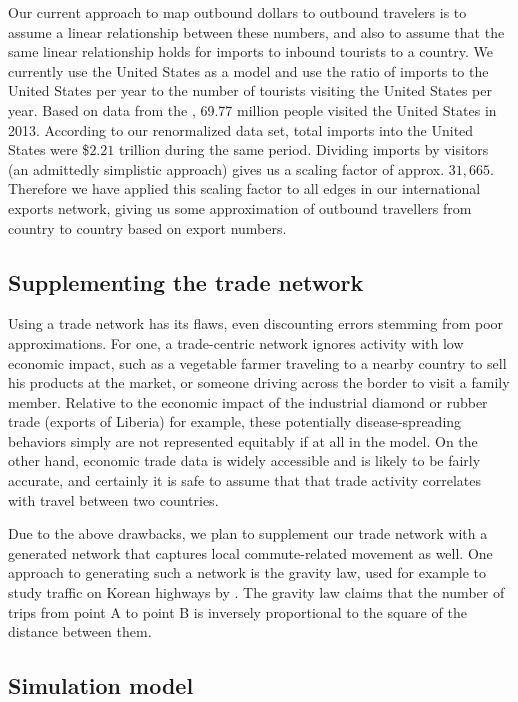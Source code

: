 \documentclass[10pt, journal,onecolumn]{IEEEtran}
\begin{document}
Our current approach to map outbound dollars to outbound travelers is to assume a linear relationship
between these numbers, and also to assume that the same linear relationship holds for imports to
inbound tourists to a country.
We currently use the United States as a model and use the ratio of
imports to the United States per year to the number of tourists visiting the United States per year.
Based on data from the \cite{usinboundtourists}, 69.77 million people visited the United States in 2013.
According to our renormalized data set, total imports into the United States were
\$$2.21$ trillion during the same period. Dividing imports by visitors (an admittedly
simplistic approach) gives us a scaling factor of approx. $31,665$. Therefore we have applied this
scaling factor to all edges in our international exports network, giving us some approximation of
outbound travellers from country to country based on export numbers.

\subsection*{\textbf{Supplementing the trade network}}

Using a trade network has its flaws, even discounting errors stemming from poor approximations.
For one, a trade-centric network ignores activity with low economic impact, such as
a vegetable farmer traveling to a nearby country to sell his products at the market, or someone
driving across the border to visit a family member. Relative to the economic impact of the industrial
diamond or rubber trade (exports of Liberia) for example, these potentially disease-spreading behaviors
simply are not represented equitably if at all in the model. On the other hand, economic trade data is
widely accessible and is likely to be fairly accurate,
and certainly it is safe to assume that that trade activity correlates with travel between two countries.

Due to the above drawbacks, we plan to supplement our trade network with a generated network that
captures local commute-related movement as well. One approach to generating such a network is the gravity law,
used for example to study traffic on Korean highways by \cite{jung2008gravity}. The gravity law
claims that the number of trips from point A to point B is inversely proportional to the square
of the distance between them.

\subsection*{\textbf{Simulation model}}
\end{document}
